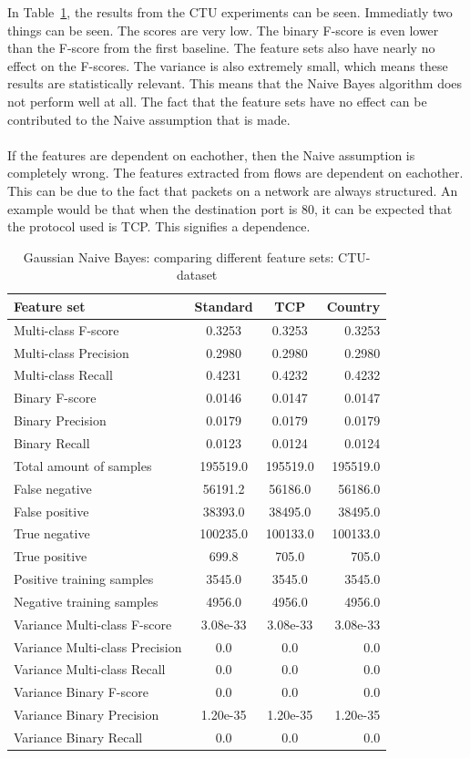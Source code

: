 \noindent In Table~\ref{tab:bay:ctu}, the results from the CTU experiments can be seen. Immediatly two things can be seen. The scores are very low. The binary F-score is even lower than the F-score from the first baseline. The feature sets also have nearly no effect on the F-scores. The variance is also extremely small, which means these results are statistically relevant. This means that the Naive Bayes algorithm does not perform well at all. The fact that the feature sets have no effect can be contributed to the Naive assumption that is made. 	\\
\\
If the features are dependent on eachother, then the Naive assumption is completely wrong. The features extracted from flows are dependent on eachother. This can be due to the fact that packets on a network are always structured. An example would be that when the destination port is $80$, it can be expected that the protocol used is TCP. This signifies a dependence. 

\begin{table}[H]
\caption{Gaussian Naive Bayes: comparing different feature sets: CTU-dataset}
\label{tab:bay:ctu}
\centering
\begin{tabular}{l c c r}
\toprule
Feature set & Standard & TCP & Country \\
\midrule
Multi-class F-score & 0.3253 & 0.3253 & 0.3253 \\
Multi-class Precision & 0.2980 & 0.2980 & 0.2980 \\
Multi-class Recall & 0.4231 & 0.4232 & 0.4232 \\
\midrule
Binary F-score & 0.0146 & 0.0147 & 0.0147 \\
Binary Precision & 0.0179 & 0.0179 & 0.0179 \\
Binary Recall & 0.0123 & 0.0124 & 0.0124 \\
\midrule
Total amount of samples & 195519.0 & 195519.0 & 195519.0 \\
False negative & 56191.2  & 56186.0 & 56186.0 \\
False positive & 38393.0 & 38495.0 & 38495.0 \\
True negative & 100235.0 & 100133.0 & 100133.0 \\
True positive & 699.8 & 705.0 & 705.0 \\
\midrule
Positive training samples & 3545.0 & 3545.0 & 3545.0\\
Negative training samples & 4956.0 & 4956.0 & 4956.0\\
\midrule
Variance Multi-class F-score & 3.08e-33 & 3.08e-33 & 3.08e-33 \\
Variance Multi-class Precision & 0.0 &  0.0 & 0.0\\
Variance Multi-class Recall &  0.0 & 0.0 &  0.0   \\
\midrule
Variance Binary F-score & 0.0 &  0.0  & 0.0 \\
Variance Binary Precision & 1.20e-35 &  1.20e-35 & 1.20e-35  \\
Variance Binary Recall & 0.0 & 0.0 & 0.0 \\
\bottomrule
\end{tabular}
\end{table}

